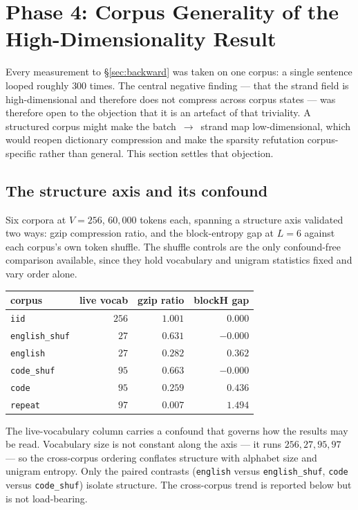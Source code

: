\section{Phase 4: Corpus Generality of the High-Dimensionality Result}
\label{sec:corpus-generality}

Every measurement to \S\ref{sec:backward} was taken on one corpus: a single
sentence looped roughly $300$ times. The central negative finding --- that the
strand field is high-dimensional and therefore does not compress across corpus
states --- was therefore open to the objection that it is an artefact of that
triviality. A structured corpus might make the batch~$\to$~strand map
low-dimensional, which would reopen dictionary compression and make the
sparsity refutation corpus-specific rather than general. This section settles
that objection.

\subsection{The structure axis and its confound}
\label{sec:axis}

Six corpora at $V=256$, $60{,}000$ tokens each, spanning a structure axis
validated two ways: gzip compression ratio, and the block-entropy gap at
$L=6$ against each corpus's own token shuffle. The shuffle controls are the
only confound-free comparison available, since they hold vocabulary and
unigram statistics fixed and vary order alone.

\begin{center}
\begin{tabular}{lrrr}
\hline
corpus & live vocab & gzip ratio & blockH gap \\
\hline
\texttt{iid}          & $256$ & $1.001$ & $0.000$ \\
\texttt{english\_shuf}& $27$  & $0.631$ & $-0.000$ \\
\texttt{english}      & $27$  & $0.282$ & $0.362$ \\
\texttt{code\_shuf}   & $95$  & $0.663$ & $-0.000$ \\
\texttt{code}         & $95$  & $0.259$ & $0.436$ \\
\texttt{repeat}       & $97$  & $0.007$ & $1.494$ \\
\hline
\end{tabular}
\end{center}

The live-vocabulary column carries a confound that governs how the results may
be read. Vocabulary size is not constant along the axis --- it runs
$256, 27, 95, 97$ --- so the cross-corpus ordering conflates structure with
alphabet size and unigram entropy. Only the paired contrasts
(\texttt{english} versus \texttt{english\_shuf}, \texttt{code} versus
\texttt{code\_shuf}) isolate structure. The cross-corpus trend is reported
below but is not load-bearing.

